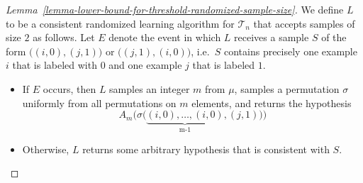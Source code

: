 \documentclass[final,12pt]{colt2018}
\newcommand{\mc}[1]{\mathcal{#1}}
\newcommand{\cT}{\mc{T}}
\begin{document}
\begin{proof}[Lemma~\ref{lemma-lower-bound-for-threshold-randomized-sample-size}]
	We define $L$ to be a consistent randomized learning algorithm for $\cT_n$ that accepts samples of size $2$ as follows. Let $E$ denote the event in which $L$ receives a sample $S$ of the form $\big((i,0),(j,1)\big)$ or $\big((j,1),(i,0)\big)$, i.e.\ $S$ contains precisely one example $i$ that is labeled with $0$ and one example $j$ that is labeled $1$.
	\begin{itemize}
		\item{If $E$ occurs, then $L$ samples an integer $m$ from $\mu$, samples a permutation $\sigma$ uniformly from all permutations on $m$ elements, and returns the hypothesis
			\[
			A_m\Big(\sigma\big(\underbrace{(i,0),\dots,(i,0)}_{\text{ m-1 }},(j,1)\big)\Big)
			\]
		}
		\item{Otherwise, $L$ returns some arbitrary hypothesis that is consistent with $S$.}
	\end{itemize}
	

\end{proof}
\end{document}
